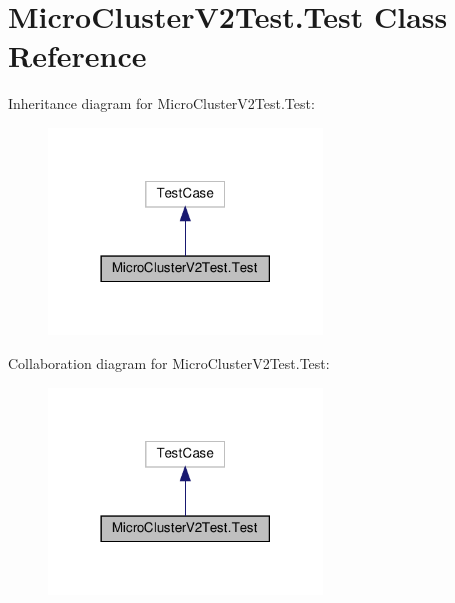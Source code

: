 \hypertarget{classMicroClusterV2Test_1_1Test}{}\section{Micro\+Cluster\+V2\+Test.\+Test Class Reference}
\label{classMicroClusterV2Test_1_1Test}


Inheritance diagram for Micro\+Cluster\+V2\+Test.\+Test\+:
\nopagebreak
\begin{figure}[H]
\begin{center}
\leavevmode
\includegraphics[width=206pt]{classMicroClusterV2Test_1_1Test__inherit__graph}
\end{center}
\end{figure}


Collaboration diagram for Micro\+Cluster\+V2\+Test.\+Test\+:
\nopagebreak
\begin{figure}[H]
\begin{center}
\leavevmode
\includegraphics[width=206pt]{classMicroClusterV2Test_1_1Test__coll__graph}
\end{center}
\end{figure}
